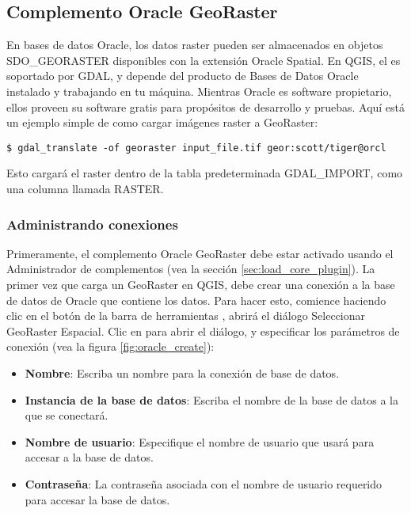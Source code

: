 
\subsection{Complemento Oracle GeoRaster}


En bases de datos Oracle, los datos raster pueden ser almacenados en objetos SDO\_GEORASTER disponibles con la extensión Oracle Spatial. En QGIS, el  
es soportado por GDAL, y depende del producto de Bases de Datos Oracle instalado y trabajando en tu máquina. Mientras Oracle es software propietario, ellos proveen su software gratis para propósitos de desarrollo y pruebas. Aquí está un ejemplo simple de como cargar imágenes raster a GeoRaster:

\begin{verbatim} 
$ gdal_translate -of georaster input_file.tif geor:scott/tiger@orcl
\end{verbatim}

Esto cargará el raster dentro de la tabla predeterminada GDAL\_IMPORT, como una columna llamada RASTER.

\subsubsection{Administrando conexiones}

Primeramente, el complemento Oracle GeoRaster debe estar activado usando el Administrador de complementos (vea la sección 
\ref{sec:load_core_plugin}). La primer vez que carga un GeoRaster en QGIS, debe crear una conexión 
a la base de datos de Oracle que contiene los datos. Para hacer esto, comience haciendo clic en 
el botón de la barra de herramientas , abrirá el diálogo Seleccionar GeoRaster Espacial. Clic en  para abrir el diálogo, y especificar los parámetros 
de conexión (vea la figura \ref{fig:oracle_create}):

\begin{itemize}
\item \textbf{Nombre}: Escriba un nombre para la conexión de base de datos.
\item \textbf{Instancia de la base de datos}: Escriba el nombre de la base de datos a la que se conectará.
\item \textbf{Nombre de usuario}: Especifique el nombre de usuario que usará para accesar a la base de datos.
\item \textbf{Contraseña}: La contraseña asociada con el nombre de usuario requerido para accesar la base de datos.
\end{itemize}

